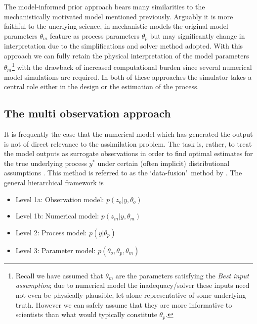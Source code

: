 \documentclass[10pt,a4paper]{article}
\begin{document}
The model-informed prior approach bears many similarities to the mechanistically motivated model mentioned previously. Arguably it is more faithful to the unerlying science, in mechanistic models the original model parameters $\theta_m$ feature as process parameters $\theta_p$ but may significantly change in interpretation due to the simplifications and solver method adopted. With this approach we can fully retain the physical interpretation of the model parameters $\theta_m$\footnote{Recall we have assumed that $\theta_m$ are the parameters satisfying the \emph{Best input assumption}; due to numerical model the inadequacy/solver these inputs need not even be physically plausible, let alone representative of some underlying truth. However we can safely assume that they are more informative to scientists than what would typically constitute $\theta_p$.} with the drawback of increased computational burden since several numerical model simulations are required. In both of these approaches the simulator takes a central role either in the design or the estimation of the process. 



\subsection{The multi observation approach}

It is frequently the case that the numerical model which has generated the output is not of direct relevance to the assimilation problem. The task is, rather, to treat the model outputs as surrogate observations in order to find optimal estimates for the true underlying process $y^*$ under certain (often implicit) distributional assumptions \citep{Berliner_2012}. This method is referred to as the \lq data-fusion\rq~method by \cite{Gelfand_2009}. The general hierarchical framework is
\begin{itemize}
\item Level 1a: Observation model: $p(z_o | y, \theta_o)$
\item Level 1b: Numerical model: $p(z_m | y, \theta_m)$
\item Level 2: Process model: $p(y | \theta_p)$
\item Level 3: Parameter model: $p(\theta_o, \theta_p, \theta_m)$
\end{itemize}
\end{document}

